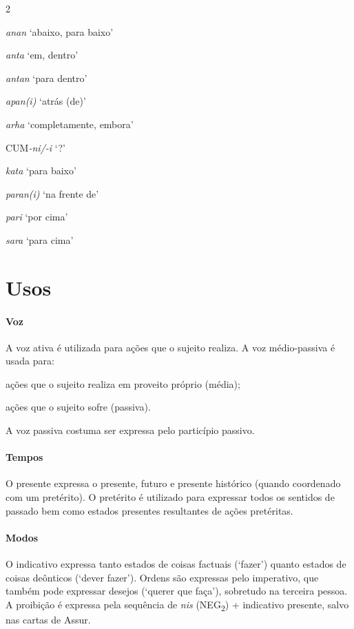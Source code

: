 \begin{multicols}{2}
	\begin{compactenum}[(a)]
		\item *\emph{anan} `abaixo, para baixo'
		\item \emph{anta} `em, dentro'
		\item \emph{antan} `para dentro'
		\item \emph{apan{(i)}} `atrás (de)'
		\item \emph{arha} `completamente, embora'
		\item CUM\emph{-ni/-i} `?'
		\item *\emph{kata} `para baixo'
		\item \emph{paran{(i)}} `na frente de'
		\item \emph{pari} `por cima'
		\item \emph{sara} `para cima'
	\end{compactenum}
\end{multicols}

\section{Usos}

\paragraph{Voz}
A voz ativa é utilizada para ações que o sujeito realiza.
A voz médio-passiva é usada para:
\begin{inparaenum}[(a)]
	\item ações que o sujeito realiza em proveito próprio (média);
	\item ações que o sujeito sofre (passiva).
\end{inparaenum}
A voz passiva costuma ser expressa pelo particípio passivo.


\paragraph{Tempos}
O presente expressa o presente, futuro e presente histórico (quando coordenado
com um pretérito).
O pretérito é utilizado para expressar todos os sentidos de passado bem como
estados presentes resultantes de ações pretéritas.


\paragraph{Modos}
O indicativo expressa tanto estados de coisas factuais (`fazer') quan\-to estados de coisas
deônticos (`dever fazer').
Ordens são expressas pelo imperativo, que também pode expressar desejos (`querer
que faça'), sobretudo na terceira pessoa.
A proibição é expressa pela sequência de \emph{nis} (NEG\textsubscript{2}) +
indicativo presente, salvo nas cartas de Assur.

